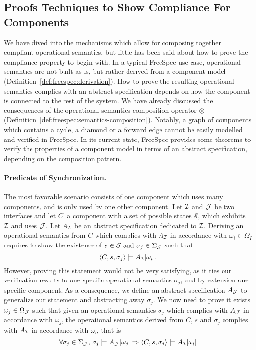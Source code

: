 \subsection{Proofs Techniques to Show Compliance For Components}

We have dived into the mechanisms which allow for composing together compliant
operational semantics, but little has been said about how to prove the
compliance property to begin with.
%
In a typical FreeSpec use case, operational semantics are not built as-is, but
rather derived from a component model
(Definition~\ref{def:freespec:derivation}).
%
How to prove the resulting operational semantics complies with an abstract
specification depends on how the component is connected to the rest of the
system.
%
We have already discussed the consequences of the operational semantics
composition operator $\otimes$
(Definition~\ref{def:freespec:semantics-composition}).
%
Notably, a graph of components which contains a cycle, a diamond or a forward
edge cannot be easily modelled and verified in FreeSpec.
%
In its current state, FreeSpec provides some theorems to verify the properties
of a component model in terms of an abstract specification, depending on the
composition pattern.

\paragraph{Predicate of Synchronization.}
%
The most favorable scenario consists of one component which uses many
components, and is only used by one other component.
%
Let $\mathcal{I}$ and $\mathcal{J}$ be two interfaces and let $C$, a component with a set of
possible states $\mathcal{S}$, which exhibits $\mathcal{I}$ and uses $\mathcal{J}$.
%
Let $A_{\mathcal{I}}$ be an abstract specification dedicated to $\mathcal{I}$.
%
Deriving an operational semantics from $C$ which complies with $A_{\mathcal{I}}$ in
accordance with $\omega_i \in \Omega_I$ requires to show the existence of
$s \in \mathcal{S} \text{ and }\sigma_j \in \Sigma_{\mathcal{J}}$ such that
\[ \langle C, s, \sigma_j \rangle \models A_{\mathcal{I}}[\omega_i]. \]
%
However, proving this statement would not be very satisfying, as it ties our
verification results to one specific operational semantics $\sigma_j$, and by
extension one specific component.
%
As a consequence, we define an abstract specification $A_{\mathcal{J}}$ to generalize our
statement and abstracting away $\sigma_j$.
%
We now need to prove it exists $\omega_j \in \Omega_{\mathcal{J}}$ such that given an
operational semantics $\sigma_j$ which complies with $A_{\mathcal{J}}$ in accordance with
$\omega_j$, the operational semantics derived from $C$, $s$ and $\sigma_j$
complies with $A_{\mathcal{I}}$ in accordance with $\omega_i$, that is
\[ \forall \sigma_j \in \Sigma_{\mathcal{J}}\text{, }\sigma_j \models A_{\mathcal{J}}[\omega_j]
  \Rightarrow \langle C, s, \sigma_j \rangle \models A_{\mathcal{I}}[\omega_i]
\]

